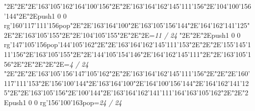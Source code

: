 \null\vfill\enskip\enskip\enskip\ipa\char"2E\enskip\enskip\enskip\ipa\char"2E\enskip\ipa\char"2E\ipa\char'163\ipa\char'105\ipa\char'162\bigskip\ipa\char'164\ipa\char'100\ipa\char'156\ipa\char"2E\enskip\enskip\enskip\ipa\char"2E\ipa\char'163\ipa\char'164\ipa\char'162\ipa\char'145\ipa\char'111\ipa\char'156\bigskip\enskip\enskip\ipa\char"2E\ipa\char'104\ipa\char'100\ipa\char'156\ipa\char'144\ipa\char"2E\enskip\ipa\char"2E\pdfcolorstack\match push{1 0 0 rg}\ipa\char'160\ipa\char'117\ipa\char'111\ipa\char'156\pdfcolorstack\match pop{}\ipa\char"2E\enskip\enskip\enskip\ipa\char"2E\ipa\char'163\ipa\char'164\ipa\char'100\ipa\char"2E\ipa\char'163\ipa\char'105\ipa\char'156\ipa\char'144\bigskip\enskip\ipa\char"2E\ipa\char'164\ipa\char'162\ipa\char'141\ipa\char'125\ipa\char"2E\enskip\enskip\ipa\char"2E\ipa\char'163\ipa\char'105\ipa\char'155\ipa\char"2E\enskip\enskip\ipa\char"2E\enskip\enskip\enskip\enskip\enskip\enskip\bigskip\ipa\char'104\ipa\char'105\ipa\char'155\ipa\char"2E\enskip\enskip\ipa\char"2E\enskip\enskip\enskip\ipa\char"2E\enskip\enskip\enskip\bigskip\vfill\footline={\hfill\tenrm\it 11 / 24}\eject
\null\vfill\enskip\enskip\enskip\ipa\char"2E\enskip\enskip\enskip\ipa\char"2E\enskip\ipa\char"2E\pdfcolorstack\match push{1 0 0 rg}\ipa\char'147\ipa\char'105\ipa\char'156\pdfcolorstack\match pop{}\bigskip\ipa\char'144\ipa\char'105\ipa\char'162\ipa\char"2E\enskip\enskip\enskip\ipa\char"2E\ipa\char'163\ipa\char'164\ipa\char'162\ipa\char'145\ipa\char'111\ipa\char'153\bigskip\enskip\enskip\ipa\char"2E\enskip\enskip\enskip\enskip\ipa\char"2E\enskip\ipa\char"2E\ipa\char'155\ipa\char'145\ipa\char'111\ipa\char'156\ipa\char"2E\ipa\char'163\ipa\char'105\ipa\char'155\ipa\char"2E\enskip\enskip\enskip\ipa\char"2E\ipa\char'144\ipa\char'105\ipa\char'154\ipa\char'146\bigskip\enskip\ipa\char"2E\ipa\char'164\ipa\char'162\ipa\char'145\ipa\char'111\ipa\char"2E\enskip\enskip\ipa\char"2E\ipa\char'163\ipa\char'105\ipa\char'156\ipa\char"2E\enskip\enskip\ipa\char"2E\enskip\enskip\enskip\enskip\enskip\enskip\bigskip\enskip\enskip\enskip\ipa\char"2E\enskip\enskip\ipa\char"2E\enskip\enskip\enskip\ipa\char"2E\enskip\enskip\enskip\bigskip\vfill\footline={\hfill\tenrm\it 4 / 24}\eject
\null\vfill\enskip\enskip\enskip\ipa\char"2E\enskip\enskip\enskip\ipa\char"2E\enskip\ipa\char"2E\ipa\char'163\ipa\char'105\ipa\char'156\bigskip\ipa\char'147\ipa\char'105\ipa\char'162\ipa\char"2E\enskip\enskip\enskip\ipa\char"2E\ipa\char'163\ipa\char'164\ipa\char'162\ipa\char'145\ipa\char'111\ipa\char'156\bigskip\enskip\enskip\ipa\char"2E\enskip\enskip\enskip\enskip\ipa\char"2E\enskip\ipa\char"2E\ipa\char'160\ipa\char'117\ipa\char'111\ipa\char'153\ipa\char"2E\ipa\char'156\ipa\char'100\ipa\char'144\ipa\char"2E\ipa\char'163\ipa\char'164\ipa\char'100\ipa\char"2E\ipa\char'164\ipa\char'100\ipa\char'156\ipa\char'144\bigskip\enskip\ipa\char"2E\ipa\char'164\ipa\char'162\ipa\char'141\ipa\char'125\ipa\char"2E\enskip\enskip\ipa\char"2E\ipa\char'163\ipa\char'105\ipa\char'156\ipa\char"2E\ipa\char'100\ipa\char'144\ipa\char"2E\ipa\char'163\ipa\char'164\ipa\char'162\ipa\char'141\ipa\char'111\ipa\char'164\bigskip\ipa\char'163\ipa\char'105\ipa\char'162\ipa\char"2E\enskip\enskip\ipa\char"2E\enskip\enskip\enskip\ipa\char"2E\pdfcolorstack\match push{1 0 0 rg}\ipa\char'156\ipa\char'100\ipa\char'163\pdfcolorstack\match pop{}\bigskip\vfill\footline={\hfill\tenrm\it 24 / 24}\eject
